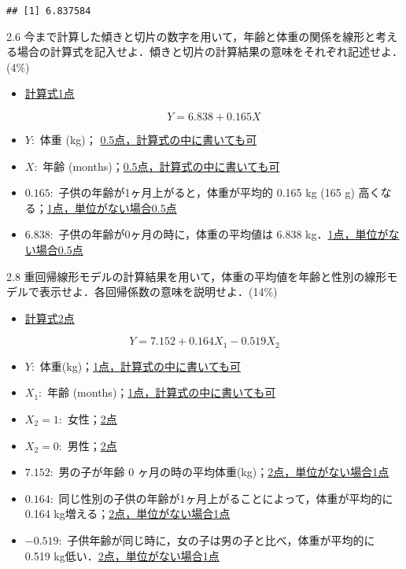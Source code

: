 \documentclass[11pt,]{problemset}
\providecommand{\tightlist}{%
  \setlength{\itemsep}{0pt}\setlength{\parskip}{0pt}}
\begin{document}
\begin{verbatim}
## [1] 6.837584
\end{verbatim}

\newpage

2.6
今まで計算した傾きと切片の数字を用いて，年齢と体重の関係を線形と考える場合の計算式を記入せよ．傾きと切片の計算結果の意味をそれぞれ記述せよ．(4\%)

\begin{itemize}
\item
  \underline{計算式1点}

  \[
  Y = 6.838 + 0.165 X
  \]
\item
  \(Y:\) 体重 (kg)； \underline{0.5点，計算式の中に書いても可}
\item
  \(X:\) 年齢 (months)；\underline{0.5点，計算式の中に書いても可}
\item
  \(0.165:\) 子供の年齢が1ヶ月上がると，体重が平均的 0.165 kg (165 g)
  高くなる；\underline{1点，単位がない場合0.5点}
\item
  \(6.838:\) 子供の年齢が0ヶ月の時に，体重の平均値は 6.838
  kg．\underline{1点，単位がない場合0.5点}
\end{itemize}

2.8
重回帰線形モデルの計算結果を用いて，体重の平均値を年齢と性別の線形モデルで表示せよ．各回帰係数の意味を説明せよ．(14\%)

\begin{itemize}
\item
  \underline{計算式2点}
\end{itemize}

\[
Y = 7.152 + 0.164 X_1 - 0.519X_2
\]

\begin{itemize}
\tightlist
\item
  \(Y:\) 体重(kg)；\underline{1点，計算式の中に書いても可}
\item
  \(X_1:\) 年齢 (months)；\underline{1点，計算式の中に書いても可}
\item
  \(X_2 = 1:\) 女性；\underline{2点}
\item
  \(X_2 = 0:\) 男性；\underline{2点}
\item
  \(7.152:\) 男の子が年齢 0
  ヶ月の時の平均体重(kg)；\underline{2点，単位がない場合1点}
\item
  \(0.164:\)
  同じ性別の子供の年齢が1ヶ月上がることによって，体重が平均的に 0.164
  kg増える；\underline{2点，単位がない場合1点}
\item
  \(-0.519:\) 子供年齢が同じ時に，女の子は男の子と比べ，体重が平均的に
  0.519 kg低い．\underline{2点，単位がない場合1点}
\end{itemize}
\end{document}

